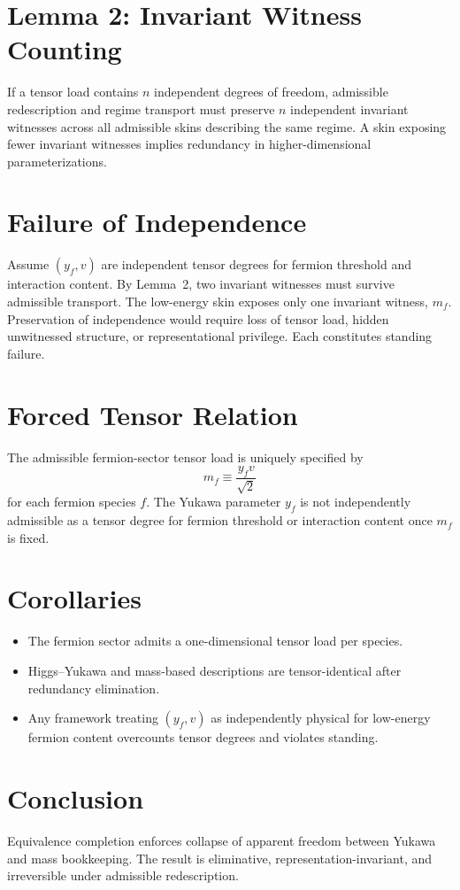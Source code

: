 ﻿\documentclass[11pt]{article}
\begin{document}
\section{Lemma 2: Invariant Witness Counting}
If a tensor load contains $n$ independent degrees of freedom, admissible redescription and regime transport must preserve $n$ independent invariant witnesses across all admissible skins describing the same regime. A skin exposing fewer invariant witnesses implies redundancy in higher-dimensional parameterizations.

\section{Failure of Independence}
Assume $(y_f, v)$ are independent tensor degrees for fermion threshold and interaction content. By Lemma~2, two invariant witnesses must survive admissible transport. The low-energy skin exposes only one invariant witness, $m_f$. Preservation of independence would require loss of tensor load, hidden unwitnessed structure, or representational privilege. Each constitutes standing failure.

\section{Forced Tensor Relation}
The admissible fermion-sector tensor load is uniquely specified by
\begin{equation}
\boxed{\;m_f \equiv \frac{y_f v}{\sqrt{2}}\;}
\end{equation}
for each fermion species $f$. The Yukawa parameter $y_f$ is not independently admissible as a tensor degree for fermion threshold or interaction content once $m_f$ is fixed.

\section{Corollaries}
\begin{itemize}
\item The fermion sector admits a one-dimensional tensor load per species.
\item Higgs--Yukawa and mass-based descriptions are tensor-identical after redundancy elimination.
\item Any framework treating $(y_f, v)$ as independently physical for low-energy fermion content overcounts tensor degrees and violates standing.
\end{itemize}

\section*{Conclusion}
Equivalence completion enforces collapse of apparent freedom between Yukawa and mass bookkeeping. The result is eliminative, representation-invariant, and irreversible under admissible redescription.
\end{document}

